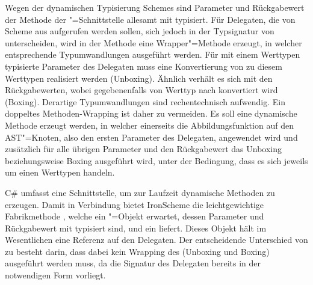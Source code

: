 Wegen der dynamischen Typisierung Schemes sind Parameter und Rückgabewert der Methode  der "=Schnittstelle allesamt mit  typisiert. Für Delegaten, die von Scheme aus aufgerufen werden sollen, sich jedoch in der Typsignatur von  unterscheiden, wird in der Methode  eine Wrapper"=Methode erzeugt, in welcher entsprechende Typumwandlungen ausgeführt werden. Für mit einem Werttypen typisierte Parameter des Delegaten muss eine Konvertierung von  zu diesem Werttypen realisiert werden (Unboxing). Ähnlich verhält es sich mit den Rückgabewerten, wobei gegebenenfalls von Werttyp nach  konvertiert wird (Boxing). Derartige Typumwandlungen sind rechentechnisch aufwendig. Ein doppeltes Methoden-Wrapping ist daher zu vermeiden. Es soll eine dynamische Methode erzeugt werden, in welcher einerseits die Abbildungsfunktion auf den AST"=Knoten, also den ersten Parameter des Delegaten, angewendet wird und zusätzlich für alle übrigen Parameter und den Rückgabewert das Unboxing beziehungsweise Boxing ausgeführt wird, unter der Bedingung, dass es sich jeweils um einen Werttypen handeln.

C\# umfasst eine Schnittstelle, um zur Laufzeit dynamische Methoden zu erzeugen. Damit in Verbindung bietet IronScheme die leichtgewichtige Fabrikmethode , welche ein "=Objekt erwartet, dessen Parameter und Rückgabewert mit  typisiert sind, und ein  liefert. Dieses Objekt hält im Wesentlichen eine Referenz auf den Delegaten. Der entscheidende Unterschied von  zu  besteht darin, dass dabei kein Wrapping des  (Unboxing und Boxing) ausgeführt werden muss, da die Signatur des Delegaten bereits in der notwendigen Form vorliegt.

